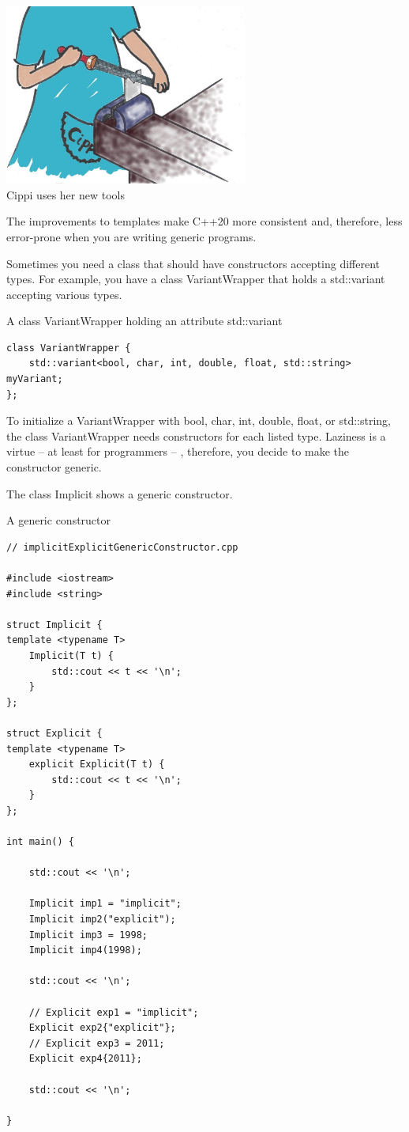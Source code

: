 \begin{center}
\includegraphics[width=0.6\textwidth]{content/3/chapter4/images/40.png}\\
Cippi uses her new tools
\end{center}

The improvements to templates make C++20 more consistent and, therefore, less error-prone when you are writing generic programs.


Sometimes you need a class that should have constructors accepting different types. For example, you have a class VariantWrapper that holds a std::variant accepting various types.

\noindent
A class VariantWrapper holding an attribute std::variant
\begin{lstlisting}[style=styleCXX]
class VariantWrapper {
	std::variant<bool, char, int, double, float, std::string> myVariant;
};
\end{lstlisting}

To initialize a VariantWrapper with bool, char, int, double, float, or std::string, the class VariantWrapper needs constructors for each listed type. Laziness is a virtue – at least for programmers – , therefore, you decide to make the constructor generic.

The class Implicit shows a generic constructor.

\noindent
A generic constructor
\begin{lstlisting}[style=styleCXX]
// implicitExplicitGenericConstructor.cpp

#include <iostream>
#include <string>

struct Implicit {
template <typename T>
	Implicit(T t) {
		std::cout << t << '\n';
	}
};

struct Explicit {
template <typename T>
	explicit Explicit(T t) {
		std::cout << t << '\n';
	}
};

int main() {
	
	std::cout << '\n';
	
	Implicit imp1 = "implicit";
	Implicit imp2("explicit");
	Implicit imp3 = 1998;
	Implicit imp4(1998);
	
	std::cout << '\n';
	
	// Explicit exp1 = "implicit";
	Explicit exp2{"explicit"};
	// Explicit exp3 = 2011;
	Explicit exp4{2011};
	
	std::cout << '\n';

}
\end{lstlisting}

